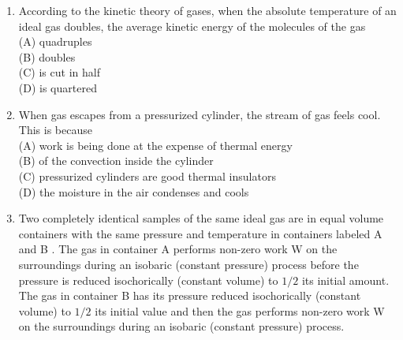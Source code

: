 \begin{enumerate}
\begin{enumerate}
(D) it turns into electrical energy
  \item According to the kinetic theory of gases, when the absolute temperature of an ideal gas doubles, the average kinetic energy of the molecules of the gas\\
(A) quadruples\\
(B) doubles\\
(C) is cut in half\\
(D) is quartered
  \item When gas escapes from a pressurized cylinder, the stream of gas feels cool. This is because\\
(A) work is being done at the expense of thermal energy\\
(B) of the convection inside the cylinder\\
(C) pressurized cylinders are good thermal insulators\\
(D) the moisture in the air condenses and cools
  \item Two completely identical samples of the same ideal gas are in equal volume containers with the same pressure and temperature in containers labeled A and B . The gas in container A performs non-zero work W on the surroundings during an isobaric (constant pressure) process before the pressure is reduced isochorically (constant volume) to $1 / 2$ its initial amount. The gas in container B has its pressure reduced isochorically (constant volume) to $1 / 2$ its initial value and then the gas performs non-zero work W on the surroundings during an isobaric (constant pressure) process.
\end{enumerate}


\end{enumerate}
